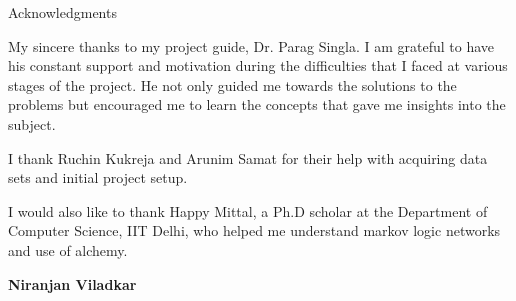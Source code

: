 \begin{center}
\LARGE{Acknowledgments} 
\end{center}

\vspace{0.5in}

My sincere thanks to my project guide, Dr. Parag Singla.
I am grateful to have his constant support and motivation
during the difficulties that I faced at various stages of the project. 
He not only guided me towards the solutions to the problems but encouraged 
me to learn the concepts that gave me insights into the subject.

I thank Ruchin Kukreja and Arunim Samat 
for their help with acquiring data sets and initial project setup.

I would also like to thank Happy Mittal, a Ph.D scholar at the Department of Computer Science, IIT Delhi, 
who helped me understand markov logic networks and use of alchemy.
\vspace{1.5in}

{\bfseries Niranjan Viladkar}
